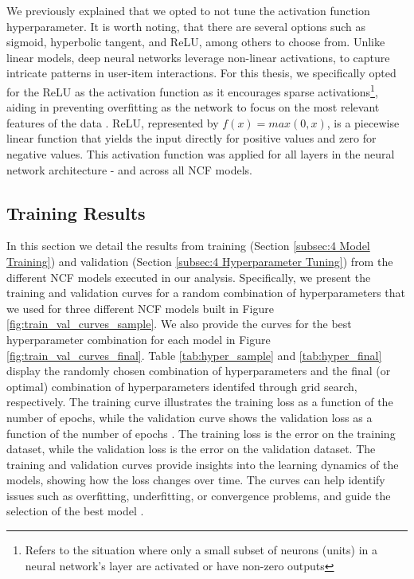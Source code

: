 We previously explained that we opted to not tune the activation function hyperparameter. It is worth noting, that there are several options such as sigmoid, hyperbolic tangent, and ReLU, among others to choose from. Unlike linear models, deep neural networks leverage non-linear activations, to capture intricate patterns in user-item interactions. For this thesis, we specifically opted for the ReLU as the activation function as it encourages sparse activations\footnote{Refers to the situation where only a small subset of neurons (units) in a neural network's layer are activated or have non-zero outputs}, aiding in preventing overfitting as the network to focus on the most relevant features of the data \cite{lecun2015deep}. ReLU, represented by $f(x)=max(0,x)$, is a piecewise linear function that yields the input directly for positive values and zero for negative values. This activation function was applied for all layers in the neural network architecture - and across all NCF models.    

\subsection{Training Results}
\label{subsec:4 Training Results}

In this section we detail the results from training (Section \ref{subsec:4 Model Training}) and validation (Section \ref{subsec:4 Hyperparameter Tuning}) from the different NCF models executed in our analysis. Specifically, we present the training and validation curves for a random combination of hyperparameters that we used for three different NCF models built in Figure \ref{fig:train_val_curves_sample}. We also provide the curves for the best hyperparameter combination for each model in Figure \ref{fig:train_val_curves_final}. Table \ref{tab:hyper_sample} and \ref{tab:hyper_final} display the randomly chosen combination of hyperparameters and the final (or optimal) combination of hyperparameters identifed through grid search, respectively. 
The training curve illustrates the training loss as a function of the number of epochs, while the validation curve shows the validation loss as a function of the number of epochs \cite{abdi1999neural}. The training loss is the error on the training dataset, while the validation loss is the error on the validation dataset. The training and validation curves provide insights into the learning dynamics of the models, showing how the loss changes over time. The curves can help identify issues such as overfitting, underfitting, or convergence problems, and guide the selection of the best model \cite{goodfellow2016deep}.


